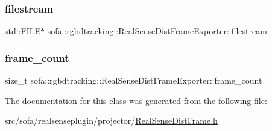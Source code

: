 \subsubsection{\texorpdfstring{filestream}{filestream}}
{\footnotesize\ttfamily std\+::\+F\+I\+LE$\ast$ sofa\+::rgbdtracking\+::\+Real\+Sense\+Dist\+Frame\+Exporter\+::filestream\hspace{0.3cm}{\ttfamily [protected]}}

\mbox{\label{classsofa_1_1rgbdtracking_1_1_real_sense_dist_frame_exporter_a0ae464397c6bf4afb7f3df3fe36d8744}} 
\subsubsection{\texorpdfstring{frame\+\_\+count}{frame\_count}}
{\footnotesize\ttfamily size\+\_\+t sofa\+::rgbdtracking\+::\+Real\+Sense\+Dist\+Frame\+Exporter\+::frame\+\_\+count\hspace{0.3cm}{\ttfamily [protected]}}



The documentation for this class was generated from the following file\+:\begin{DoxyCompactItemize}
\item 
src/sofa/realsenseplugin/projector/\hyperlink{_real_sense_dist_frame_8h}{Real\+Sense\+Dist\+Frame.\+h}\end{DoxyCompactItemize}
